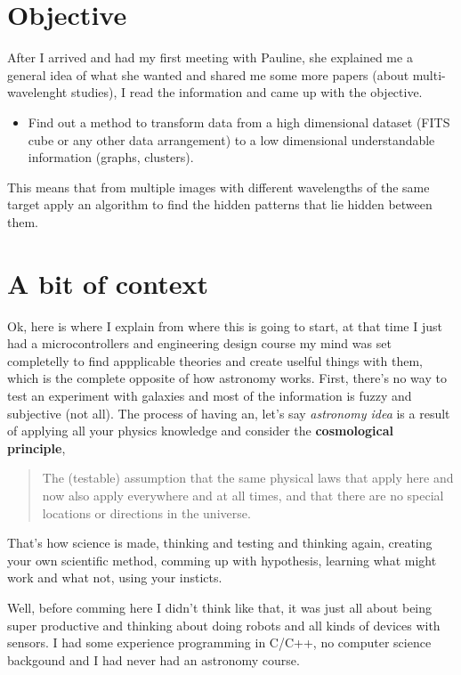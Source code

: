 \documentclass[11pt,fleqn]{book} %
\begin{document}
\section{Objective}
After I arrived and had my first meeting with Pauline, she explained me a general idea of what she wanted and shared me some more papers (about multi-wavelenght studies), I read the information and came up with the objective.

\begin{itemize}
\item Find out a method to transform data from a high dimensional dataset (FITS cube or any other data arrangement) to a low dimensional understandable information (graphs, clusters).
\end{itemize}

This means that from multiple images with different wavelengths of the same target apply an algorithm to find the hidden patterns that lie hidden between them.

\section{A bit of context}
Ok, here is where I explain from where this is going to start, at that time I just had a microcontrollers and engineering design course my mind was set completelly to find appplicable theories and create uselful things with them, which is the complete opposite of how astronomy works. First, there's no way to test an experiment with galaxies and most of the information is fuzzy and subjective (not all). The process of having an, let's say \emph{astronomy idea} is a result of applying all your physics knowledge and consider the \textbf{cosmological principle},
\begin{quote}
The (testable) assumption that the same physical laws that apply here and now also apply everywhere and at all times, and that there are no special locations or directions in the universe.
\end{quote}

That's how science is made, thinking and testing and thinking again, creating your own scientific method, comming up with hypothesis, learning what might work and what not, using your insticts. 

Well, before comming here I didn't think like that, it was just all about being super productive and thinking about doing robots and all kinds of devices with sensors. I had some experience programming in C/C++, no computer science backgound and I had never had an astronomy course.
\end{document}

